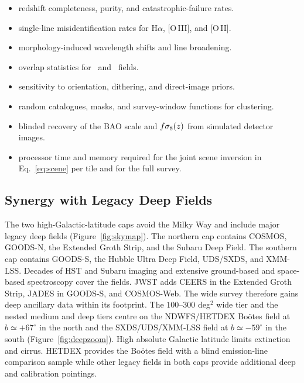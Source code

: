 \begin{itemize}
  \item redshift completeness, purity, and catastrophic-failure rates.
  \item single-line misidentification rates for H$\alpha$, [O\,III], and [O\,II].
  \item morphology-induced wavelength shifts and line broadening.
  \item overlap statistics for \fovsmall\ and \fovlarge\ fields.
  \item sensitivity to orientation, dithering, and direct-image priors.
  \item random catalogues, masks, and survey-window functions for clustering.
  \item blinded recovery of the BAO scale and $f\sigma_8(z)$ from simulated detector images.
  \item processor time and memory required for the joint scene inversion in Eq.~\eqref{eq:scene} per tile and for the full survey.
\end{itemize}

\subsection{Synergy with Legacy Deep Fields}\label{sec:deepfields}

The two high-Galactic-latitude caps avoid the Milky Way and include major legacy deep fields (Figure~\ref{fig:skymap}). The northern cap contains COSMOS, GOODS-N, the Extended Groth Strip, and the Subaru Deep Field. The southern cap contains GOODS-S, the Hubble Ultra Deep Field, UDS/SXDS, and XMM-LSS. Decades of HST and Subaru imaging and extensive ground-based and space-based spectroscopy cover the fields. JWST adds CEERS in the Extended Groth Strip, JADES in GOODS-S, and COSMOS-Web. The wide survey therefore gains deep ancillary data within its footprint. The $100$--$300$ deg$^2$ wide tier and the nested medium and deep tiers centre on the NDWFS/HETDEX Bo\"otes field at $b\simeq+67^\circ$ in the north and the SXDS/UDS/XMM-LSS field at $b\simeq-59^\circ$ in the south (Figure~\ref{fig:deepzoom}). High absolute Galactic latitude limits extinction and cirrus. HETDEX provides the Bo\"otes field with a blind emission-line comparison sample while other legacy fields in both caps provide additional deep and calibration pointings.

